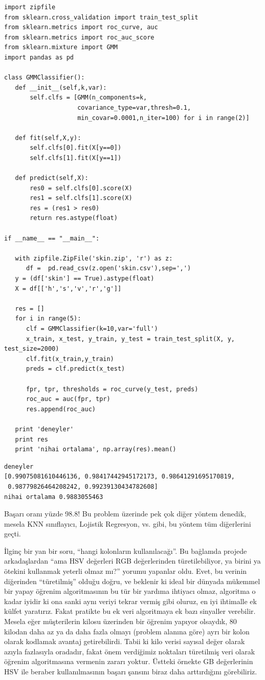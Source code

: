 \documentclass[12pt,fleqn]{article}\usepackage{../../common}
\begin{document}
\begin{verbatim}
import zipfile
from sklearn.cross_validation import train_test_split
from sklearn.metrics import roc_curve, auc
from sklearn.metrics import roc_auc_score
from sklearn.mixture import GMM
import pandas as pd

class GMMClassifier():
   def __init__(self,k,var):
       self.clfs = [GMM(n_components=k,
                    covariance_type=var,thresh=0.1, 
                    min_covar=0.0001,n_iter=100) for i in range(2)]

   def fit(self,X,y):
       self.clfs[0].fit(X[y==0])
       self.clfs[1].fit(X[y==1])

   def predict(self,X):
       res0 = self.clfs[0].score(X)
       res1 = self.clfs[1].score(X)
       res = (res1 > res0)
       return res.astype(float)

if __name__ == "__main__": 
 
   with zipfile.ZipFile('skin.zip', 'r') as z:
      df =  pd.read_csv(z.open('skin.csv'),sep=',')
   y = (df['skin'] == True).astype(float)
   X = df[['h','s','v','r','g']]
   
   res = []   
   for i in range(5):
      clf = GMMClassifier(k=10,var='full')
      x_train, x_test, y_train, y_test = train_test_split(X, y, test_size=2000)
      clf.fit(x_train,y_train)
      preds = clf.predict(x_test)

      fpr, tpr, thresholds = roc_curve(y_test, preds)
      roc_auc = auc(fpr, tpr)
      res.append(roc_auc)

   print 'deneyler'
   print res
   print 'nihai ortalama', np.array(res).mean()
\end{verbatim}

\begin{verbatim}
deneyler 
[0.99075081610446136, 0.98417442945172173, 0.98641291695170819,
 0.98779826464208242, 0.99239130434782608] 
nihai ortalama 0.9883055463
\end{verbatim}

Başarı oranı yüzde 98.8! Bu problem üzerinde pek çok diğer yöntem denedik,
mesela KNN sınıflayıcı, Lojistik Regresyon, vs. gibi, bu yöntem tüm
diğerlerini geçti. 

İlginç bir yan bir soru, ``hangi kolonların kullanılacağı''. Bu bağlamda
projede arkadaşlardan ``ama HSV değerleri RGB değerlerinden
türetilebiliyor, ya birini ya ötekini kullanmak yeterli olmaz mı?'' yorumu
yapanlar oldu. Evet, bu verinin diğerinden ``türetilmiş'' olduğu doğru, ve
beklenir ki ideal bir dünyada mükemmel bir yapay öğrenim algoritmasının bu
tür bir yardıma ihtiyacı olmaz, algoritma o kadar iyidir ki ona sanki aynı
veriyi tekrar vermiş gibi oluruz, en iyi ihtimalle ek külfet
yaratırız. Fakat pratikte bu ek veri algoritmaya ek bazı sinyaller
verebilir. Mesela eğer müşterilerin kilosu üzerinden bir öğrenim yapıyor
olsaydık, 80 kilodan daha az ya da daha fazla olmayı (problem alanına göre)
ayrı bir kolon olarak kodlamak avantaj getirebilirdi. Tabii ki kilo verisi
sayısal değer olarak azıyla fazlasıyla oradadır, fakat önem verdiğimiz
noktaları türetilmiş veri olarak öğrenim algoritmasına vermenin zararı
yoktur. Üstteki örnekte GB değerlerinin HSV ile beraber kullanılmasının
başarı şansını biraz daha arttırdığını görebiliriz.
\end{document}
